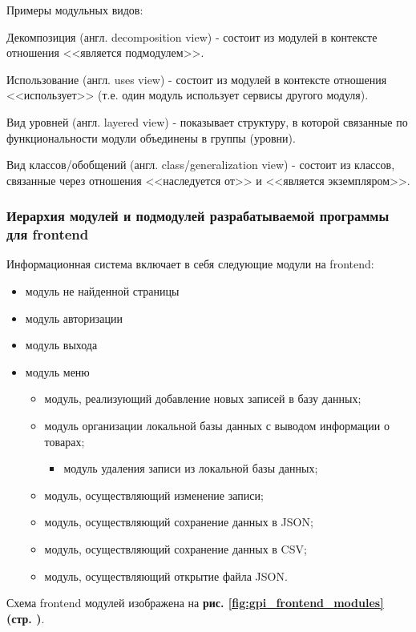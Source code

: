 Примеры модульных видов:

Декомпозиция (англ. decomposition view) - состоит из модулей в контексте
отношения <<является подмодулем>>.

Использование (англ. uses view) - состоит из модулей в контексте
отношения <<использует>> (т.е. один модуль использует сервисы другого модуля).

Вид уровней (англ. layered view) - показывает структуру,
в которой связанные по функциональности модули объединены в группы (уровни).

Вид классов/обобщений (англ. class/generalization view) - состоит из классов,
связанные через отношения <<наследуется от>> и <<является экземпляром>>.

\subsubsection*{Иерархия модулей и подмодулей разрабатываемой программы для frontend}

Информационная система включает в себя следующие модули на frontend:

\begin{itemize}
    \item модуль не найденной страницы
    \item модуль авторизации
    \item модуль выхода
    \item модуль меню
    \begin{itemize}
        \item модуль, реализующий добавление новых записей в базу данных;
        \item модуль организации локальной базы данных с выводом информации о товарах;
        \begin{itemize}
            \item модуль удаления записи из локальной базы данных;
        \end{itemize}
        \item модуль, осуществляющий изменение записи;
        \item модуль, осуществляющий сохранение данных в JSON;
        \item модуль, осуществляющий сохранение данных в CSV;
        \item модуль, осуществляющий открытие файла JSON.
    \end{itemize}
\end{itemize}

Схема frontend модулей изображена на
\textbf{рис. \ref{fig:gpi_frontend_modules} (стр. \pageref{fig:gpi_frontend_modules})}.

